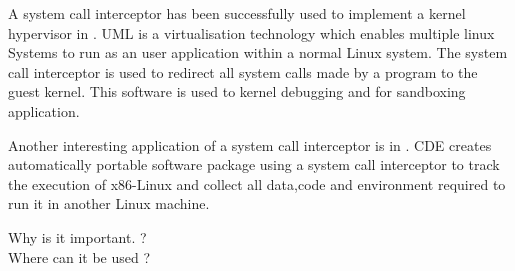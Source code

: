 A system call interceptor has been successfully used to implement a kernel hypervisor  in \cite{UML_1, UML_2}. UML is a virtualisation technology which enables multiple linux Systems to run as an user application within a normal Linux system. The system call interceptor is used to redirect all system calls made by a program to the guest kernel. This software is used to kernel debugging and for sandboxing application. 

Another interesting application of a system call interceptor is in \cite{CDE}.
CDE creates automatically portable software package using a system call interceptor to track the execution of x86-Linux and collect all data,code and environment required to run it in another Linux machine.  

Why is it important. ? \\ 

Where can it be used ? \\

